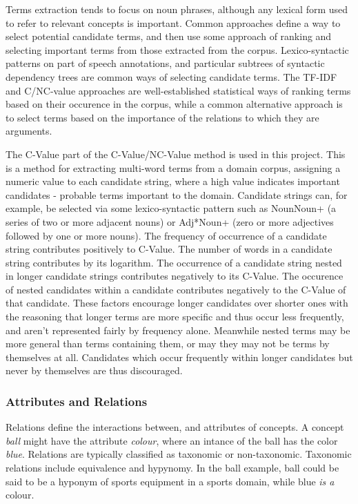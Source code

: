 \documentclass[a4paper]{report}
\begin{document}
Terms extraction tends to focus on noun phrases, although any lexical form used to refer to relevant concepts is important.
Common approaches define a way to select potential candidate terms, and then use some approach of ranking and selecting important terms from those extracted from the corpus.
Lexico-syntactic patterns on part of speech annotations, and particular subtrees of syntactic dependency trees are common ways of selecting candidate terms.
The TF-IDF and C/NC-value approaches are well-established statistical ways of ranking terms based on their occurence in the corpus, while a common alternative approach is to select terms based on the importance of the relations to which they are arguments.

The C-Value part of the C-Value/NC-Value method is used in this project.
This is a method for extracting multi-word terms from a domain corpus, assigning a numeric value to each candidate string, where a high value indicates important candidates - probable terms important to the domain.
Candidate strings can, for example, be selected via some lexico-syntactic pattern such as NounNoun+ (a series of two or more adjacent nouns) or Adj*Noun+ (zero or more adjectives followed by one or more nouns).
The frequency of occurrence of a candidate string contributes positively to C-Value.
The number of words in a candidate string contributes by its logarithm.
The occurrence of a candidate string nested in longer candidate strings contributes negatively to its C-Value.
The occurence of nested candidates within a candidate contributes negatively to the C-Value of that candidate.
These factors encourage longer candidates over shorter ones with the reasoning that longer terms are more specific and thus occur less frequently, and aren't represented fairly by frequency alone.
Meanwhile nested terms may be more general than terms containing them, or may they may not be terms by themselves at all.
Candidates which occur frequently within longer candidates but never by themselves are thus discouraged.

\subsubsection{Attributes and Relations}

Relations define the interactions between, and attributes of concepts.
A concept \emph{ball} might have the attribute \emph{colour}, where an intance of the ball has the color \emph{blue}.
Relations are typically classified as taxonomic or non-taxonomic.
Taxonomic relations include equivalence and hypynomy.
In the ball example, ball could be said to be a hyponym of sports equipment in a sports domain, while blue \emph{is a} colour.
\end{document}
